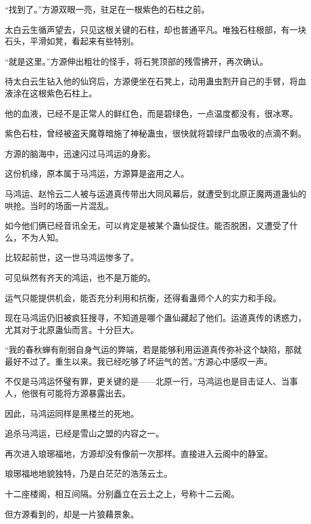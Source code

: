 
\begin{this_body}

“找到了。”方源双眼一亮，驻足在一根紫色的石柱之前。

太白云生循声望去，只见这根关键的石柱，却也普通平凡。唯独石柱根部，有一块石头，平滑如凳，看起来有些特别。

“就是这里。”方源伸出粗壮的怪手，将石凳顶部的残雪拂开，再次确认。

待太白云生钻入他的仙窍后，方源便坐在石凳上，动用蛊虫割开自己的手臂，将血液涂在这根紫色石柱上。

他的血液，已经不是正常人的鲜红色，而是碧绿色，一点温度都没有，很冰寒。

紫色石柱，曾经被盗天魔尊暗施了神秘蛊虫，很快就将碧绿尸血吸收的点滴不剩。

方源的脑海中，迅速闪过马鸿运的身影。

这份机缘，原本属于马鸿运，方源算是盗用之人。

马鸿运、赵怜云二人被与运道真传带出大同风幕后，就遭受到北原正魔两道蛊仙的哄抢。当时的场面一片混乱。

如今他们俩已经音讯全无，可以肯定是被某个蛊仙捉住。能否脱困，又遭受了什么，不为人知。

比较起前世，这一世马鸿运惨多了。

可见纵然有齐天的鸿运，也不是万能的。

运气只能提供机会，能否充分利用和抗衡，还得看蛊师个人的实力和手段。

现在马鸿运仍旧被疯狂搜寻，不知道是哪个蛊仙藏起了他们。运道真传的诱惑力，尤其对于北原蛊仙而言。十分巨大。

“我的春秋蝉有削弱自身气运的弊端，若是能够利用运道真传弥补这个缺陷，那就最好不过了。重生以来。我已经吃够了坏运气的苦。”方源心中感叹一声。

不仅是马鸿运怀璧有罪，更关键的是——北原一行，马鸿运也是目击证人、当事人，他很有可能将方源暴露出去。

因此，马鸿运同样是黑楼兰的死地。

追杀马鸿运，已经是雪山之盟的内容之一。

再次进入琅琊福地，方源却没有像前一次那样。直接进入云阁中的静室。

琅琊福地地貌独特，乃是白茫茫的浩荡云土。

十二座楼阁，相互间隔。分别矗立在云土之上，号称十二云阁。

但方源看到的，却是一片狼藉景象。


\end{this_body}
